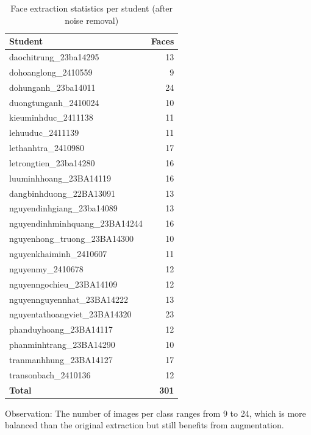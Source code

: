 \documentclass[12pt,a4paper]{article}
\begin{document}
\begin{table}[H]
    \centering
    \caption{Face extraction statistics per student (after noise removal)}
    \label{tab:extract_summary}
    \begin{tabular}{l r}
        \toprule
        \textbf{Student} & \textbf{Faces} \\
        \midrule
        daochitrung\_23ba14295      & 13 \\
        dohoanglong\_2410559        & 9  \\
        dohunganh\_23ba14011        & 24 \\
        duongtunganh\_2410024       & 10 \\
        kieuminhduc\_2411138        & 11 \\
        lehuuduc\_2411139           & 11 \\
        lethanhtra\_2410980         & 17 \\
        letrongtien\_23ba14280      & 16 \\
        luuminhhoang\_23BA14119     & 16 \\
        dangbinhduong\_22BA13091  & 13 \\
        nguyendinhgiang\_23ba14089  & 13 \\
        nguyendinhminhquang\_23BA14244 & 16 \\
        nguyenhong\_truong\_23BA14300 & 10 \\
        nguyenkhaiminh\_2410607     & 11 \\
        nguyenmy\_2410678           & 12 \\
        nguyenngochieu\_23BA14109   & 12 \\
        nguyennguyennhat\_23BA14222 & 13 \\
        nguyentathoangviet\_23BA14320 & 23 \\
        phanduyhoang\_23BA14117     & 12 \\
        phanminhtrang\_23BA14290    & 10 \\
        tranmanhhung\_23BA14127     & 17 \\
        transonbach\_2410136        & 12 \\
        \midrule
        \textbf{Total} & \textbf{301} \\
        \bottomrule
    \end{tabular}
\end{table}

Observation: The number of images per class ranges from 9 to 24, which is more balanced than the original extraction but still benefits from augmentation.
\end{document}
